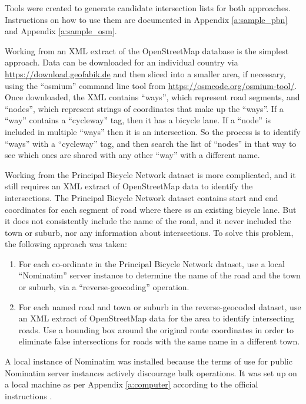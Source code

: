 \documentclass[11pt,twoside]{report}
\begin{document}
Tools were created to generate candidate intersection lists for both approaches.  Instructions on how to use them are documented in Appendix \ref{a:sample_pbn} and Appendix \ref{a:sample_osm}.

Working from an XML extract of the OpenStreetMap database is the simplest approach.  Data can be downloaded for an individual country via \url{https://download.geofabik.de} and then sliced into a smaller area, if necessary, using the ``osmium'' command line tool from \url{https://osmcode.org/osmium-tool/}.  Once downloaded, the XML contains ``ways'', which represent road segments, and ``nodes'', which represent strings of coordinates that make up the ``ways''.  If a ``way'' contains a ``cycleway'' tag, then it has a bicycle lane.  If a ``node'' is included in multiple ``ways'' then it is an intersection.  So the process is to identify ``ways'' with a ``cycleway'' tag, and then search the list of ``nodes'' in that way to see which ones are shared with any other ``way'' with a different name.

Working from the Principal Bicycle Network dataset is more complicated, and it still requires an XML extract of OpenStreetMap data to identify the intersections.  The Principal Bicycle Network dataset contains start and end coordinates for each segment of road where there ss an existing bicycle lane.  But it does not consistently include the name of the road, and it never included the town or suburb, nor any information about intersections.  To solve this problem, the following approach was taken:

\begin{enumerate}
\item{For each co-ordinate in the Principal Bicycle Network dataset, use a local ``Nominatim'' server instance to determine the name of the road and the town or suburb, via a ``reverse-geocoding'' operation.}
\item{For each named road and town or suburb in the reverse-geocoded dataset, use an XML extract of OpenStreetMap data for the area to identify intersecting roads.  Use a bounding box around the original route coordinates in order to eliminate false intersections for roads with the same name in a different town.}	
\end{enumerate}

A local instance of Nominatim was installed because the terms of use for public Nominatim server instances actively discourage bulk operations.  It was set up on a local machine as per Appendix \ref{a:computer} according to the official instructions \cite{nominatim_install}.
\end{document}
